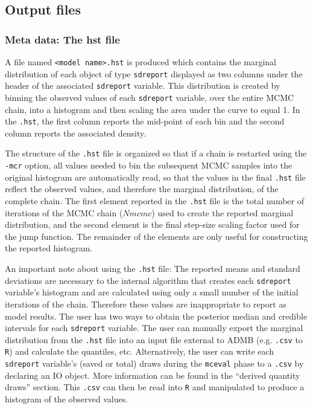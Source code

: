 \documentclass{article}\usepackage[]{graphicx}\usepackage[]{color}
\begin{document}
\subsection{Output files}\label{sec:outfiles}
\subsubsection{Meta data: The hst file}
A file named \texttt{<model name>.hst} is produced which contains the
marginal distribution of each object of type \texttt{sdreport} displayed 
as two columns under the header of the associated \texttt{sdreport} variable. 
This distribution is created by binning the observed values of each 
\texttt{sdreport} variable, over the entire MCMC chain, into a histogram and 
then scaling the area under the curve to equal 1. In the \texttt{.hst}, the 
first column reports the mid-point of each bin and the second column reports 
the associated density.

The structure of the \texttt{.hst} file is organized so that if a chain is 
restarted using the \texttt{-mcr} option, all values needed to bin the 
subsequent MCMC samples into the original histogram are automatically read, 
so that the values in the final \texttt{.hst} file reflect the observed values, 
and therefore the marginal distribution, of the complete chain. The first element 
reported in the \texttt{.hst} file is the total number of iterations of the 
MCMC chain ($Nmcmc$) used to create the reported marginal distribution, and the second 
element is the final step-size scaling factor used for the jump function. The
remainder of the elements are only useful for constructing the reported histogram.

An important note about using the \texttt{.hst} file: The reported means and 
standard deviations are necessary to the internal algorithm that creates 
each \texttt{sdreport} variable's histogram and are calculated using only a 
small number of the initial iterations of the chain. Therefore these values 
are inappropriate to report as model results. The user has two ways to obtain 
the posterior median and credible intervals for each \texttt{sdreport} variable. 
The user can manually export the marginal distribution from the \texttt{.hst} 
file into an input file external to ADMB (e.g. \texttt{.csv} to \texttt{R}) and 
calculate the quantiles, etc. Alternatively, the user can write each \texttt{sdreport} 
variable's (saved or total) draws during the \texttt{mceval} phase to a \texttt{.csv} 
by declaring an IO object. More information can be found in the ``derived quantity 
draws'' section. This \texttt{.csv} can then be read into \texttt{R} and manipulated 
to produce a histogram of the observed values.
\end{document}
